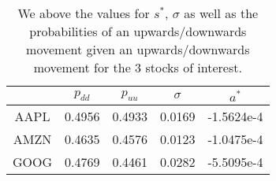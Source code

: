\begin{table}[htpb]

\centering
\small

\begin{tabular}{ c | c | c | c | c }
 & $p_{dd}$ & $p_{uu}$ & $\sigma$ & $a^*$\\
\hline
AAPL & 0.4956 & 0.4933 & 0.0169 & -1.5624e-4\\
AMZN & 0.4635 & 0.4576 & 0.0123 & -1.0475e-4\\
GOOG & 0.4769 & 0.4461 & 0.0282 & -5.5095e-4\\
\end{tabular}

\caption{\label{table:2SDO_coeff} We above the values for $s^*$, $\sigma$ as well as the probabilities of an upwards/downwards movement given an upwards/downwards movement for the 3 stocks of interest.}
\end{table}